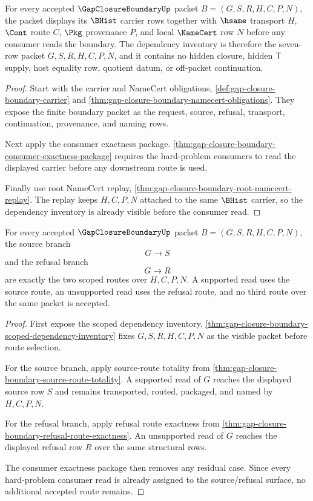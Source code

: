 \begin{theorem}
\label{thm:gap-closure-boundary-scoped-dependency-inventory}
For every accepted $\GapClosureBoundaryUp$ packet $B=(G,S,R,H,C,P,N)$, the packet displays its $\BHist$ carrier rows together with $\hsame$ transport $H$, $\Cont$ route $C$, $\Pkg$ provenance $P$, and local $\NameCert$ row $N$ before any consumer reads the boundary. The dependency inventory is therefore the seven-row packet $G,S,R,H,C,P,N$, and it contains no hidden closure, hidden $\mathsf{T}$ supply, host equality row, quotient datum, or off-packet continuation.
\end{theorem}
\begin{proof}
Start with the carrier and NameCert obligations, \autoref{def:gap-closure-boundary-carrier} and \autoref{thm:gap-closure-boundary-namecert-obligations}. They expose the finite boundary packet as the request, source, refusal, transport, continuation, provenance, and naming rows.

Next apply the consumer exactness package. \autoref{thm:gap-closure-boundary-consumer-exactness-package} requires the hard-problem consumers to read the displayed carrier before any downstream route is used.

Finally use root NameCert replay, \autoref{thm:gap-closure-boundary-root-namecert-replay}. The replay keeps $H,C,P,N$ attached to the same $\BHist$ carrier, so the dependency inventory is already visible before the consumer read.
\end{proof}

\begin{theorem}
\label{thm:gap-closure-boundary-scoped-source-refusal-exactness}
For every accepted $\GapClosureBoundaryUp$ packet $B=(G,S,R,H,C,P,N)$, the source branch
$$
G \longrightarrow S
$$
and the refusal branch
$$
G \longrightarrow R
$$
are exactly the two scoped routes over $H,C,P,N$. A supported read uses the source route, an unsupported read uses the refusal route, and no third route over the same packet is accepted.
\end{theorem}
\begin{proof}
First expose the scoped dependency inventory. \autoref{thm:gap-closure-boundary-scoped-dependency-inventory} fixes $G,S,R,H,C,P,N$ as the visible packet before route selection.

For the source branch, apply source-route totality from \autoref{thm:gap-closure-boundary-source-route-totality}. A supported read of $G$ reaches the displayed source row $S$ and remains transported, routed, packaged, and named by $H,C,P,N$.

For the refusal branch, apply refusal route exactness from \autoref{thm:gap-closure-boundary-refusal-route-exactness}. An unsupported read of $G$ reaches the displayed refusal row $R$ over the same structural rows.

The consumer exactness package then removes any residual case. Since every hard-problem consumer read is already assigned to the source/refusal surface, no additional accepted route remains.
\end{proof}

